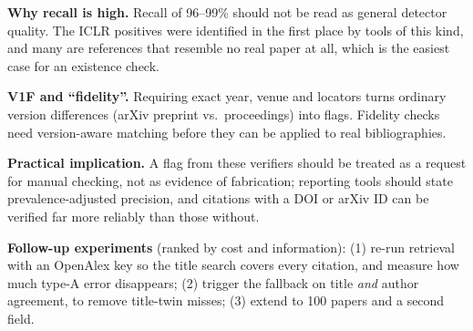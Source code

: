 \documentclass[conference]{IEEEtran}
\begin{document}
\textbf{Why recall is high.} Recall of 96--99\% should not be read as general detector quality. The ICLR
positives were identified in the first place by tools of this kind, and many are references that resemble
no real paper at all, which is the easiest case for an existence check.

\textbf{V1F and ``fidelity''.} Requiring exact year, venue and locators turns ordinary version differences
(arXiv preprint vs.\ proceedings) into flags. Fidelity checks need version-aware matching before they can
be applied to real bibliographies.

\textbf{Practical implication.} A flag from these verifiers should be treated as a request for manual
checking, not as evidence of fabrication; reporting tools should state prevalence-adjusted precision,
and citations with a DOI or arXiv ID can be verified far more reliably than those without.

\textbf{Follow-up experiments} (ranked by cost and information): (1) re-run retrieval with an OpenAlex key so
the title search covers every citation, and measure how much type-A error disappears; (2) trigger the
fallback on title \emph{and} author agreement, to remove title-twin misses; (3) extend to 100 papers and a
second field.

\end{document}
